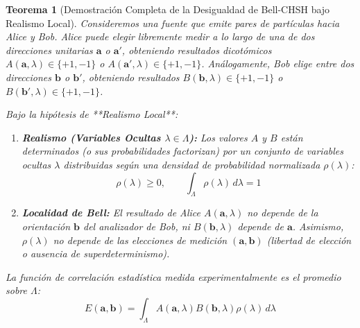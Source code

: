 \documentclass[11pt,a4paper]{book}
\newtheorem{teorema}{Teorema}[chapter]
\begin{document}
\begin{teorema}[Demostración Completa de la Desigualdad de Bell-CHSH bajo Realismo Local]
Consideremos una fuente que emite pares de partículas hacia Alice y Bob. Alice puede elegir libremente medir a lo largo de una de dos direcciones unitarias $\mathbf{a}$ o $\mathbf{a}'$, obteniendo resultados dicotómicos $A(\mathbf{a}, \lambda) \in \{+1, -1\}$ o $A(\mathbf{a}', \lambda) \in \{+1, -1\}$. Análogamente, Bob elige entre dos direcciones $\mathbf{b}$ o $\mathbf{b}'$, obteniendo resultados $B(\mathbf{b}, \lambda) \in \{+1, -1\}$ o $B(\mathbf{b}', \lambda) \in \{+1, -1\}$.

Bajo la hipótesis de **Realismo Local**:
\begin{enumerate}
    \item \textbf{Realismo (Variables Ocultas $\lambda \in \Lambda$):} Los valores $A$ y $B$ están determinados (o sus probabilidades factorizan) por un conjunto de variables ocultas $\lambda$ distribuidas según una densidad de probabilidad normalizada $\rho(\lambda)$:
    \begin{equation}
    \rho(\lambda) \geq 0, \qquad \int_{\Lambda} \rho(\lambda) \, d\lambda = 1
    \end{equation}
    \item \textbf{Localidad de Bell:} El resultado de Alice $A(\mathbf{a}, \lambda)$ no depende de la orientación $\mathbf{b}$ del analizador de Bob, ni $B(\mathbf{b}, \lambda)$ depende de $\mathbf{a}$. Asimismo, $\rho(\lambda)$ no depende de las elecciones de medición $(\mathbf{a}, \mathbf{b})$ (\textit{libertad de elección} o ausencia de superdeterminismo).
\end{enumerate}

La función de correlación estadística medida experimentalmente es el promedio sobre $\Lambda$:
\begin{equation}
E(\mathbf{a}, \mathbf{b}) = \int_{\Lambda} A(\mathbf{a}, \lambda) B(\mathbf{b}, \lambda) \rho(\lambda) \, d\lambda
\end{equation}


\end{teorema}
\end{document}
